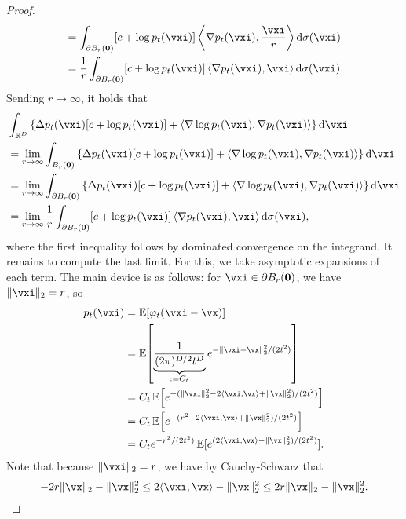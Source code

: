 \documentclass[../../book-main.tex]{subfiles}
\begin{document}
\begin{proof}
\begin{align}
        &= \int_{\partial B_{r}(\vzero)}[c + \log p_{t}(\vxi)]\ip*{\nabla p_{t}(\vxi)}{\frac{\vxi}{r}}\odif{\sigma(\vxi)} \\
        &= \frac{1}{r}\int_{\partial B_{r}(\vzero)}[c + \log p_{t}(\vxi)]\ip*{\nabla p_{t}(\vxi)}{\vxi}\odif{\sigma(\vxi)}.
    \end{align}
    Sending \(r \to \infty\), it holds that 
    \begin{align}
        &\int_{\R^{D}}\bc{\Delta p_{t}(\vxi)[c + \log p_{t}(\vxi)] + \ip{\nabla \log p_{t}(\vxi)}{\nabla p_{t}(\vxi)}}\odif{\vxi} \label{eq:app_diffusion_r_infinity_limit} \\
        &= \lim_{r \to \infty}\int_{B_{r}(\vzero)}\bc{\Delta p_{t}(\vxi)[c + \log p_{t}(\vxi)] + \ip{\nabla \log p_{t}(\vxi)}{\nabla p_{t}(\vxi)}}\odif{\vxi} \\
        &= \lim_{r \to \infty}\int_{\partial B_{r}(\vzero)}\bc{\Delta p_{t}(\vxi)[c + \log p_{t}(\vxi)] + \ip{\nabla \log p_{t}(\vxi)}{\nabla p_{t}(\vxi)}}\odif{\vxi} \\ 
        &= \lim_{r \to \infty}\frac{1}{r}\int_{\partial B_{r}(\vzero)}[c + \log p_{t}(\vxi)]\ip*{\nabla p_{t}(\vxi)}{\vxi}\odif{\sigma(\vxi)},
    \end{align}
    where the first inequality follows by dominated convergence on the integrand. It remains to compute the last limit. For this, we take asymptotic expansions of each term. The main device is as follows: for \(\vxi \in \partial B_{r}(\vzero)\), we have \(\norm{\vxi}_{2} = r\), so
    \begin{align}
        p_{t}(\vxi)
        &= \Ex[\phi_{t}(\vxi - \vx)] \\ 
        &= \Ex\rs{\underbrace{\frac{1}{(2\pi)^{D/2}t^{D}}}_{:= C_{t}}e^{-\|\vxi - \vx\|_{2}^{2}/(2t^{2})}} \\
        &= C_{t}\Ex\rs{e^{-(\norm{\vxi}_{2}^{2} - 2\ip{\vxi}{\vx} + \norm{\vx}_{2}^{2})/(2t^{2})}} \\ 
        &= C_{t}\Ex\rs{e^{-(r^{2} - 2\ip{\vxi}{\vx} + \norm{\vx}_{2}^{2})/(2t^{2})}} \\ 
        &= C_{t}e^{-r^{2}/(2t^{2})}\Ex[e^{(2\ip{\vxi}{\vx} - \norm{\vx}_{2}^{2})/(2t^{2})}].
    \end{align}
    Note that because \(\norm{\vxi}_{2} = r\), we have by Cauchy-Schwarz that
    \begin{equation}
        -2r\norm{\vx}_{2} - \norm{\vx}_{2}^{2} \leq 2\ip{\vxi}{\vx} - \norm{\vx}_{2}^{2} \leq 2r\norm{\vx}_{2} - \norm{\vx}_{2}^{2}.
    \end{equation}

\end{proof}
\end{document}
